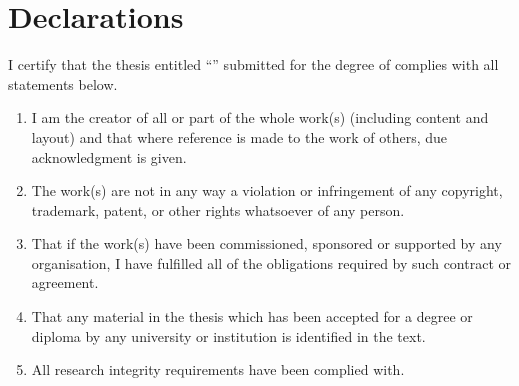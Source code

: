\newpage
\chapter*{Declarations}

I certify that the thesis entitled ``\textit{\thetitle{}}'' submitted for the degree of \thedegree{} complies with all statements below.

\begin{enumerate}[label=\roman*)]
  \item I am the creator of all or part of the whole work(s) (including content and layout) and that where reference is made to the work of others, due acknowledgment is given.    
  \item The work(s) are not in any way a violation or infringement of any copyright, trademark, patent, or other rights whatsoever of any person.
  \item That if the work(s) have been commissioned, sponsored or supported by any organisation, I have fulfilled all of the obligations required by such contract or agreement.
  \item That any material in the thesis which has been accepted for a degree or diploma by any university or institution is identified in the text.
  \item All research integrity requirements have been complied with.
\end{enumerate}

\vspace{2cm}

\noindent
\hspace{\fill}
\parbox[b]{0.4\linewidth}{
  \hrulefill\\
  \raggedleft
  \theauthor{}\\
  \footnotesize
  \theauthorspostnominals{}\\
  \thedate{}
}